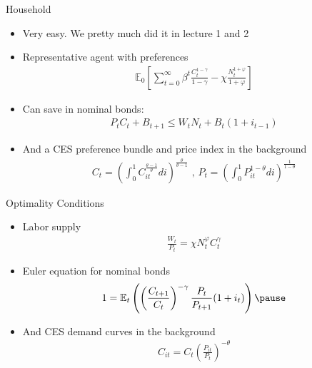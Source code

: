 \documentclass[11pt,aspectratio=169,xcolor={dvipsnames},hyperref={pdftex,pdfpagemode=UseNone,hidelinks,pdfdisplaydoctitle=true},usepdftitle=false]{beamer}
\begin{document}
\begin{frame}{Household}
\begin{itemize}
\item Very easy. We pretty much did it in lecture 1 and 2
\item Representative agent with preferences
\begin{align*}
\mathbb{E}_0 \left[ \sum_{t=0}^{\infty} \beta^t \frac{C^{1-\gamma}_t}{1-\gamma} - \chi \frac{N^{1+\varphi}_t}{1+\varphi} \right]
\end{align*}
\pause
\item Can save in nominal bonds:
\begin{align*}
P_t C_t + B_{t+1}  \leq W_t N_t + B_t (1+i_{t-1}) 
\end{align*}
\pause
\item And a CES preference bundle and price index in the background
\begin{align*}
C_t = \left(\int_0^1 C^{\frac{\theta-1}{\theta}}_{it} di \right)^{\frac{\theta}{\theta-1}} \text{     ,    } P_t = \left(\int_0^1 P^{1-\theta}_{it} di \right)^{\frac{1}{1-\theta}} 
\end{align*}
\end{itemize}
\end{frame}

\begin{frame}{Optimality Conditions}
\begin{itemize}
\item Labor supply
\begin{align*}
\frac{W_t}{P_t} = \chi N^{\varphi}_t C_t^{\gamma}
\end{align*}
\pause
\item Euler equation for nominal bonds
\begin{align*}
1 = \mathbb{E}_t \left( \left(\frac{C_{t+1}}{C_t}\right)^{-\gamma} \frac{P_t}{P_{t+1}}(1+i_t)\right)
\pause
\end{align*}
\item And CES demand curves in the background
\begin{align*}
C_{it} = C_t \left(\frac{P_{it}}{P_t}\right)^{-\theta}
\end{align*}
\end{itemize}
\end{frame}
\end{document}
